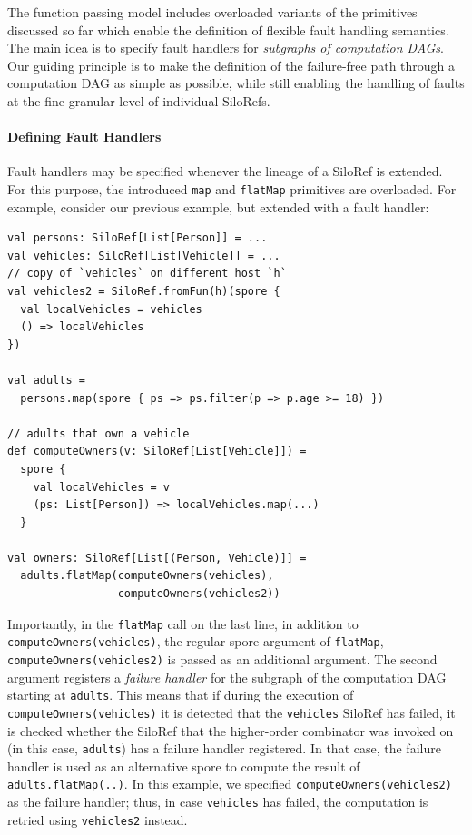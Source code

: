 \documentclass[10pt]{sigplanconf}
\theoremstyle{definition}
\theoremstyle{definition}
\begin{document}
The function passing model includes overloaded variants of the primitives discussed so far which
enable the definition of flexible fault handling semantics. The main idea is to
specify fault handlers for \emph{subgraphs of computation DAGs}. Our guiding
principle is to make the definition of the failure-free path through a
computation DAG as simple as possible, while still enabling the handling of
faults at the fine-granular level of individual SiloRefs.

\paragraph{Defining Fault Handlers}

Fault handlers may be specified whenever the lineage of a SiloRef is extended.
For this purpose, the introduced \verb|map| and \verb|flatMap| primitives are
overloaded. For example, consider our previous example, but extended with a
fault handler:

\begin{lstlisting}
val persons: SiloRef[List[Person]] = ...
val vehicles: SiloRef[List[Vehicle]] = ...
// copy of `vehicles` on different host `h`
val vehicles2 = SiloRef.fromFun(h)(spore {
  val localVehicles = vehicles
  () => localVehicles
})

val adults =
  persons.map(spore { ps => ps.filter(p => p.age >= 18) })

// adults that own a vehicle
def computeOwners(v: SiloRef[List[Vehicle]]) =
  spore {
    val localVehicles = v
    (ps: List[Person]) => localVehicles.map(...)
  }

val owners: SiloRef[List[(Person, Vehicle)]] =
  adults.flatMap(computeOwners(vehicles),
                 computeOwners(vehicles2))
\end{lstlisting}

Importantly, in the \verb|flatMap| call on the last line, in addition to
\verb|computeOwners(vehicles)|, the regular spore argument of \verb|flatMap|,
\verb|computeOwners(vehicles2)| is passed as an additional argument. The second
argument registers a \emph{failure handler} for the subgraph of the computation
DAG starting at \verb|adults|. This means that if during the execution of
\verb|computeOwners(vehicles)| it is detected that the \verb|vehicles| SiloRef
has failed, it is checked whether the SiloRef that the higher-order combinator
was invoked on (in this case, \verb|adults|) has a failure handler registered.
In that case, the failure handler is used as an alternative spore to compute
the result of \verb|adults.flatMap(..)|. In this example, we specified
\verb|computeOwners(vehicles2)| as the failure handler; thus, in case
\verb|vehicles| has failed, the computation is retried using \verb|vehicles2|
instead.
\end{document}
